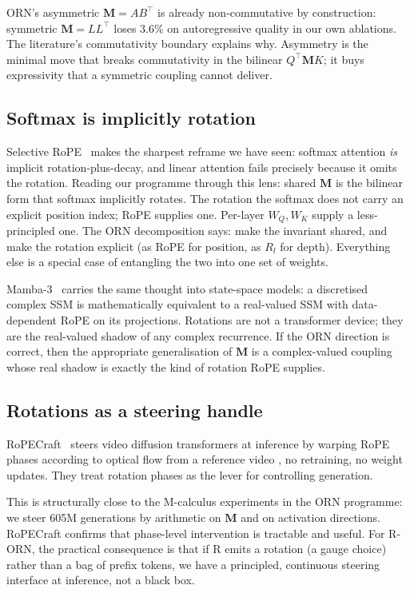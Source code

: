 \documentclass[10pt, twocolumn, a4paper]{article}
\newcommand{\M}{\mathbf{M}}
\begin{document}
ORN's asymmetric $\M = A B^\top$ is already non-commutative by construction: symmetric $\M = L L^\top$ loses $3.6\%$ on autoregressive quality in our own ablations. The literature's commutativity boundary explains why. Asymmetry is the minimal move that breaks commutativity in the bilinear $Q^\top \M K$; it buys expressivity that a symmetric coupling cannot deliver.

\subsection{Softmax is implicitly rotation}

Selective RoPE~\cite{selective2025} makes the sharpest reframe we have seen: softmax attention \emph{is} implicit rotation-plus-decay, and linear attention fails precisely because it omits the rotation. Reading our programme through this lens: shared $\M$ is the bilinear form that softmax implicitly rotates. The rotation the softmax does not carry an explicit position index; RoPE supplies one. Per-layer $W_Q, W_K$ supply a less-principled one. The ORN decomposition says: make the invariant shared, and make the rotation explicit (as RoPE for position, as $R_l$ for depth). Everything else is a special case of entangling the two into one set of weights.

Mamba-3~\cite{goel2026mamba3} carries the same thought into state-space models: a discretised complex SSM is mathematically equivalent to a real-valued SSM with data-dependent RoPE on its projections. Rotations are not a transformer device; they are the real-valued shadow of any complex recurrence. If the ORN direction is correct, then the appropriate generalisation of $\M$ is a complex-valued coupling whose real shadow is exactly the kind of rotation RoPE supplies.

\subsection{Rotations as a steering handle}

RoPECraft~\cite{ropecraft2025} steers video diffusion transformers at inference by warping RoPE phases according to optical flow from a reference video ,  no retraining, no weight updates. They treat rotation phases as the lever for controlling generation.

This is structurally close to the M-calculus experiments in the ORN programme: we steer 605M generations by arithmetic on $\M$ and on activation directions. RoPECraft confirms that phase-level intervention is tractable and useful. For R-ORN, the practical consequence is that if R emits a rotation (a gauge choice) rather than a bag of prefix tokens, we have a principled, continuous steering interface at inference, not a black box.
\end{document}
